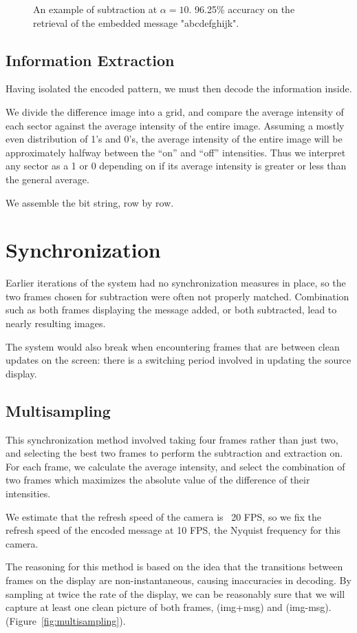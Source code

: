\documentclass[11pt, letterpaper]{article}
\begin{document}
\begin{figure}[hbtp]
\caption{An example of subtraction at $\alpha = 10$. 96.25\% accuracy on the retrieval of the embedded message "abcdefghijk".}
\label{fig:subtract}
\end{figure}

\subsection{Information Extraction}
Having isolated the encoded pattern, we must then decode the information inside.

We divide the difference image into a grid, and compare the average intensity of each sector against the average intensity of the entire image.
Assuming a mostly even distribution of 1's and 0's, the average intensity of the entire image will be approximately halfway between the ``on'' and ``off'' intensities. Thus we interpret any sector as a 1 or 0 depending on if its average intensity is greater or less than the general average.

We assemble the bit string, row by row.

\section{Synchronization}
Earlier iterations of the system had no synchronization measures in place, so the two frames chosen for subtraction were often not properly matched.
Combination such as both frames displaying the message added, or both subtracted, lead to nearly resulting images.

The system would also break when encountering frames that are between clean updates on the screen: there is a switching period involved in updating the source display.

\subsection{Multisampling}
This synchronization method involved taking four frames rather than just two, and selecting the best two frames to perform the subtraction and extraction on.
For each frame, we calculate the average intensity, and select the combination of two frames which maximizes the absolute value of the difference of their intensities.

We estimate that the refresh speed of the camera is ~20 FPS, so we fix the refresh speed of the encoded message at 10 FPS, the Nyquist frequency for this camera.

The reasoning for this method is based on the idea that the transitions between frames on the display are non-instantaneous, causing inaccuracies in decoding.
By sampling at twice the rate of the display, we can be reasonably sure that we will capture at least one clean picture of both frames, (img+msg) and (img-msg). (Figure~\ref{fig:multisampling}).
\end{document}
